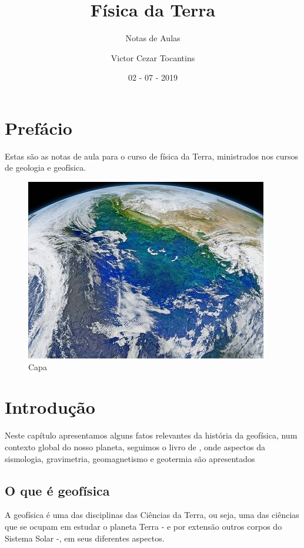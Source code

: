 \documentclass[]{book}
\title{Física da Terra}
\subtitle{Notas de Aulas}
\author{Victor Cezar Tocantins}
\date{02 - 07 - 2019}
\theoremstyle{definition}
\theoremstyle{definition}
\theoremstyle{definition}
\theoremstyle{remark}
\begin{document}
\maketitle

{
\hypersetup{linkcolor=black}
\setcounter{tocdepth}{1}
\tableofcontents
}
\hypertarget{prefacio}{%
\chapter*{Prefácio}\label{prefacio}}

Estas são as notas de aula para o curso de física da Terra, ministrados nos cursos de geologia e geofísica.

\begin{figure}
\centering
\includegraphics{images/cover.jpg}
\caption{Capa}
\end{figure}

\hypertarget{cap01}{%
\chapter{Introdução}\label{cap01}}

Neste capítulo apresentamos alguns fatos relevantes da história da geofísica, num contexto global do nosso planeta, seguimos o livro de \citet{Ribeiro2018}, onde aspectos da sismologia, gravimetria, geomagnetismo e geotermia são apresentados

\hypertarget{o-que-e-geofisica}{%
\section{O que é geofísica}\label{o-que-e-geofisica}}

A geofísica é uma das disciplinas das Ciências da Terra, ou seja, uma das ciências que se ocupam em estudar o planeta Terra - e por extensão outros corpos do Sistema Solar -, em seus diferentes aspectos.
\end{document}
